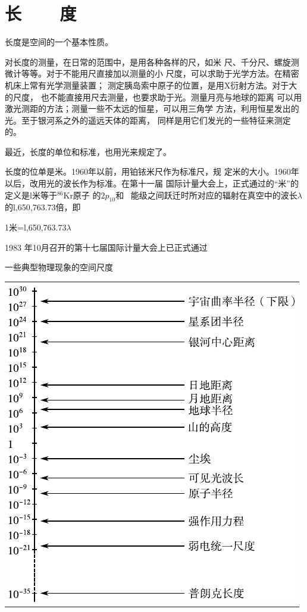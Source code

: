 \section[长度]{长~~~~度}\label{sec:01.03}

长度是空间的一个基本性质。

对长度的测量，在日常的范围中，是用各种各样的尺，如米
尺、千分尺、螺旋测微计等等。对于不能用尺直接加以测量的小
尺度，可以求助于光学方法。在精密机床上常有光学测量装置；
测定胰岛索中原子的位置，是用X衍射方法。对于大的尺度，
也不能直接用尺去测量，也要求助于光。测量月亮与地球的距离
可以用激光测距的方法；测量一些不太远的恒星，可以用三角学
方法，利用恒星发出的光。至于银河系之外的遥远天体的距离，
同样是用它们发光的一些特征来测定的。

最近，长度的单位和标准，也用光来规定了。

长度的位单是米。1960年以前，用铂铱米尺作为标准尺，规
定米的大小。1960年以后，改用光的波长作为标准。在第十一届
国际计量大会上，正式通过的“米”的定义是l米等于$^{86}$Kr原子
的$2p_{10}$和~
能级之间跃迁时所对应的辐射在真空中的波长$\lambda$的l,650,763.73倍，即

\centerline{1米=l,650,763.73$\lambda$}


1983 年10月召开的第十七届国际计量大会上已正式通过
\\
\begin{tablex}[!h]{0.6em}
    \centering
    \caption{一些典型物理现象的空间尺度}
    \label{tab:01.03}
    \begin{tabular}{c}
        \toprule \vspace{-1em}                \\
        \includegraphics{figure/tab01.03.pdf} \\
        \bottomrule
    \end{tabular}
\end{tablex}
\clearpage

